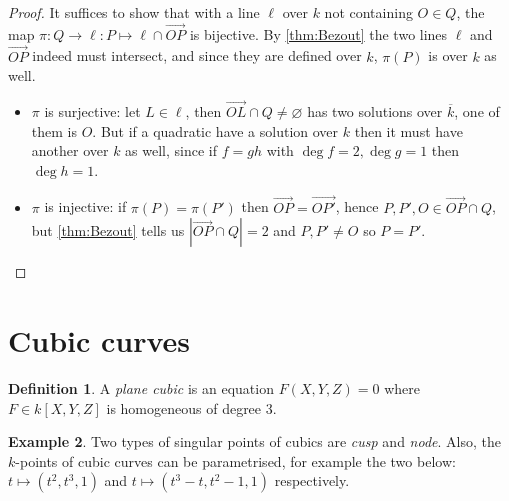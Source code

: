 \documentclass{article}
\theoremstyle{definition}
\newtheorem{defn}{Definition}[subsection]
\newtheorem{example}[defn]{Example}
\begin{document}
\begin{proof}
It suffices to show that with a line $\ell$ over $k$ not containing $O\in Q$, the map $\pi:Q\rightarrow\ell:P\mapsto\ell\cap\overrightarrow{OP}$ is bijective. By \ref{thm:Bezout} the two lines $\ell$ and $\overrightarrow{OP}$ indeed must intersect, and since they are defined over $k$, $\pi(P)$ is over $k$ as well.
\begin{itemize}
\item $\pi$ is surjective: let $L\in\ell$, then $\overrightarrow{OL}\cap Q\neq\varnothing$ has two solutions over $\overline k$, one of them is $O$. But if a quadratic have a solution over $k$ then it must have another over $k$ as well, since if $f=gh$ with $\deg f=2,\deg g=1$ then $\deg h=1$.
\item $\pi$ is injective: if $\pi(P)=\pi(P')$ then $\overrightarrow{OP}=\overrightarrow{OP'}$, hence $P,P',O\in\overrightarrow{OP}\cap Q$, but \ref{thm:Bezout} tells us $|\overrightarrow{OP}\cap Q|=2$ and $P,P'\neq O$ so $P=P'$.
\end{itemize}
\end{proof}

\section{Cubic curves}
\begin{defn}
A \textit{plane cubic} is an equation $F(X,Y,Z)=0$ where $F\in k[X,Y,Z]$ is homogeneous of degree 3.
\end{defn}

\begin{example}
Two types of singular points of cubics are \textit{cusp} and \textit{node}. Also, the $k$-points of cubic curves can be parametrised, for example the two below: $t\mapsto (t^2,t^3,1)$ and $t\mapsto (t^3-t,t^2-1,1)$ respectively.
\end{example}
\end{document}
